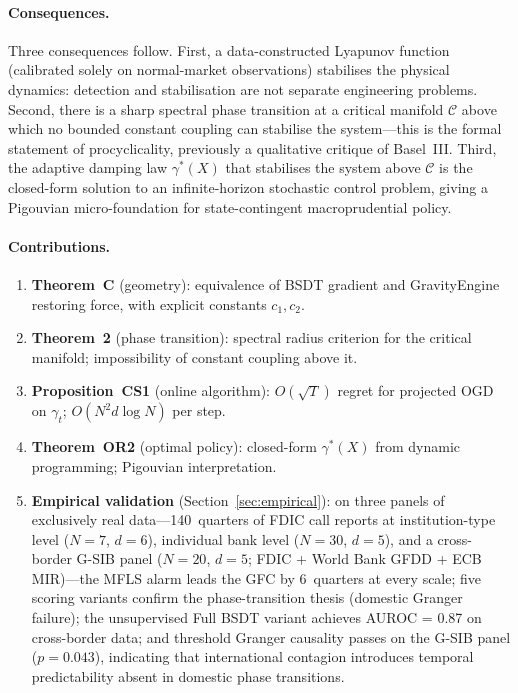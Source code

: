 \documentclass[11pt]{article}
\theoremstyle{definition}
\newcommand{\Cman}{\mathcal{C}}
\begin{document}
\paragraph{Consequences.}
Three consequences follow.  First, a data-constructed Lyapunov function (calibrated
solely on normal-market observations) stabilises the physical dynamics: detection
and stabilisation are not separate engineering problems.  Second, there is a sharp
spectral phase transition at a critical manifold $\Cman$ above which no bounded
constant coupling can stabilise the system---this is the formal statement of
procyclicality, previously a qualitative critique of Basel~III.  Third, the adaptive
damping law $\gamma^*(X)$ that stabilises the system above $\Cman$ is the
closed-form solution to an infinite-horizon stochastic control problem, giving a
Pigouvian micro-foundation for state-contingent macroprudential policy.

\paragraph{Contributions.}
\begin{enumerate}
  \item \textbf{Theorem~C} (geometry): equivalence of BSDT gradient and GravityEngine
        restoring force, with explicit constants $c_1, c_2$.
  \item \textbf{Theorem~2} (phase transition): spectral radius criterion for the
        critical manifold; impossibility of constant coupling above it.
  \item \textbf{Proposition~CS1} (online algorithm): $O(\sqrt{T})$ regret for
        projected OGD on $\gamma_t$; $O(N^2 d \log N)$ per step.
  \item \textbf{Theorem~OR2} (optimal policy): closed-form $\gamma^*(X)$ from
        dynamic programming; Pigouvian interpretation.
  \item \textbf{Empirical validation} (Section~\ref{sec:empirical}): on three
        panels of exclusively real data---140~quarters of FDIC call reports at
        institution-type level ($N=7$, $d=6$), individual bank level ($N=30$,
        $d=5$), and a cross-border G-SIB panel ($N=20$, $d=5$; FDIC +
        World Bank GFDD + ECB MIR)---the MFLS alarm leads the GFC by
        6~quarters at every scale; five scoring variants confirm
        the phase-transition thesis (domestic Granger failure); the
        unsupervised Full BSDT variant achieves AUROC = 0.87 on cross-border
        data; and threshold Granger causality passes on the G-SIB panel
        ($p = 0.043$), indicating that international contagion introduces
        temporal predictability absent in domestic phase transitions.
\end{enumerate}
\end{document}

